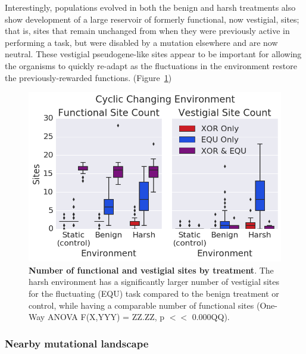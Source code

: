 \documentclass[letterpaper]{article}
\begin{document}
Interestingly, populations evolved in both the benign and harsh treatments also show development of a large reservoir of formerly functional, now vestigial, sites; that is, sites that remain unchanged from when they were previously active in performing a task, but were disabled by a mutation elsewhere and are now neutral. 
These vestigial pseudogene-like sites appear to be important for allowing the organisms to quickly re-adapt as the fluctuations in the environment restore the previously-rewarded functions. (Figure~\ref{fig:CCE_func_vestigial})
\begin{figure}[h!]
\begin{center}
\includegraphics[trim={0 0 0 0}, clip, width=1\columnwidth]{figures/CCE_func_vest__box.png}
\caption{\textbf{Number of functional and vestigial sites by treatment}. The harsh environment has a significantly larger number of vestigial sites for the fluctuating (EQU) task compared to the benign treatment or control, while having a comparable number of functional sites (One-Way ANOVA F(X,YYY) = ZZ.ZZ, p $<<$ 0.000QQ).%
}
\label{fig:CCE_func_vestigial} %
\end{center}
\end{figure}
\subsubsection{Nearby mutational landscape}
\end{document}
